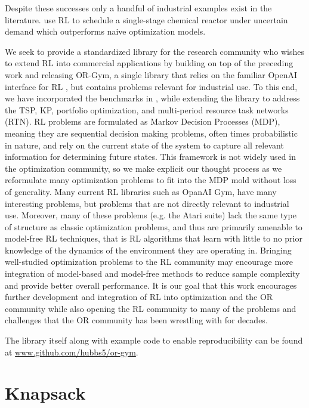 \documentclass[12pt]{article}
\begin{document}
Despite these successes only a handful of industrial examples exist in the literature. 
\citet{Hubbs2020} use RL to schedule a single-stage chemical reactor under uncertain demand which outperforms naive optimization models. 

We seek to provide a standardized library for the research community who wishes to extend RL into commercial applications by building on top of the preceding work and releasing OR-Gym, a single library that relies on the familiar OpenAI interface for RL \citep{Brockman2016}, but contains problems relevant for industrial use.
To this end, we have incorporated the benchmarks in \citet{Balaji2019}, while extending the library to address the TSP, KP, portfolio optimization, and multi-period resource task networks (RTN). 
RL problems are formulated as Markov Decision Processes (MDP), meaning they are sequential decision making problems, often times probabilistic in nature, and rely on the current state of the system to capture all relevant information for determining future states. %
This framework is not widely used in the optimization community, so we make explicit our thought process as we reformulate many optimization problems to fit into the MDP mold without loss of generality.
Many current RL libraries such as OpanAI Gym, have many interesting problems, but problems that are not directly relevant to industrial use.
Moreover, many of these problems (e.g. the Atari suite) lack the same type of structure as classic optimization problems, and thus are primarily amenable to model-free RL techniques, that is RL algorithms that learn with little to no prior knowledge of the dynamics of the environment they are operating in.
Bringing well-studied optimization problems to the RL community may encourage more integration of model-based and model-free methods to reduce sample complexity and provide better overall performance.
It is our goal that this work encourages further development and integration of RL into optimization and the OR community while also opening the RL community to many of the problems and challenges that the OR community has been wrestling with for decades.

The library itself along with example code to enable reproducibility can be found at \href{www.github.com/hubbs5/or-gym}{www.github.com/hubbs5/or-gym}.

\section{Knapsack}
\end{document}
